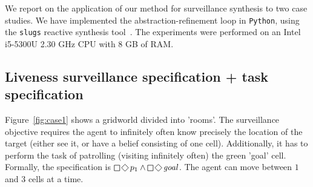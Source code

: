 We report on the application of our method for surveillance synthesis to two case studies. We have implemented the abstraction-refinement loop in \texttt{Python}, using the \texttt{slugs} reactive synthesis tool~\cite{EhlersR16}. The experiments were performed on an Intel i5-5300U 2.30 GHz CPU with 8 GB of RAM. 

\subsection{Liveness surveillance specification + task specification}
Figure~\ref{fig:case1} shows a gridworld divided into  'rooms'. The surveillance objective requires the agent to infinitely often know precisely the location of the target (either see it, or have a belief consisting of one cell). Additionally, it has to perform the task of patrolling (visiting infinitely often) the green 'goal' cell. Formally, the specification is $\LTLglobally\LTLfinally p_1 \wedge \LTLglobally\LTLfinally \mathit{goal}$. The agent can move between $1$ and $3$ cells at a time.


